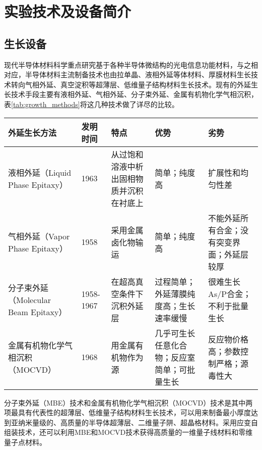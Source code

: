 % 

\chapter{实验技术及设备简介}
\section{生长设备}

现代半导体材料科学重点研究基于各种半导体微结构的光电信息功能材料，与之相对应，半导体材料主流制备技术也由拉单晶、液相外延等体材料、厚膜材料生长技术转向气相外延、真空淀积等超薄层、低维量子结构材料生长技术。现有的外延生长技术手段主要有液相外延、气相外延、分子束外延、金属有机物化学气相沉积，表\ref{tab:growth_methods}将这几种技术做了详尽的比较。

\begin{table*}[htbp] 
	\centering
	\caption{\label{tab:growth_methods}外延生长技术手段}  
	\begin{tabular}{m{}<{\centering}m{}<{\centering}m{}m{}m{}}  
		\toprule
			外延生长方法 & 发明时间 & 特点 & 优势 & 劣势 \\
		\midrule 
			液相外延（Liquid Phase Epitaxy） & 1963 & 从过饱和溶液中析出固相物质并沉积在衬底上 & 简单；纯度高 & 扩展性和均匀性差 \\
			气相外延（Vapor Phase Epitaxy） & 1958 & 采用金属卤化物输运 & 简单；纯度高 & 不能外延所有合金；没有突变界面；外延层较厚 \\
			分子束外延（Molecular Beam Epitaxy） & 1958-1967 & 在超高真空条件下沉积外延层 & 过程简单；外延薄膜纯度高；生长速率缓慢 & 很难生长As/P合金；不利于批量生长 \\
			金属有机物化学气相沉积（MOCVD） & 1968 & 用金属有机物作为源 & 几乎可生长任意化合物；反应室简单；可批量生长 & 反应物价格高；参数控制严格；源毒性大 \\
		\bottomrule
	\end{tabular}
\end{table*}


分子束外延（MBE）技术和金属有机物化学气相沉积（MOCVD）技术是其中两项最具有代表性的超薄层、低维量子结构材料生长技术，可以用来制备最小厚度达到亚纳米量级的、高质量的半导体超薄层、二维量子阱、超晶格材料。采用应变自组装技术，还可以利用MBE和MOCVD技术获得高质量的一维量子线材料和零维量子点材料。

